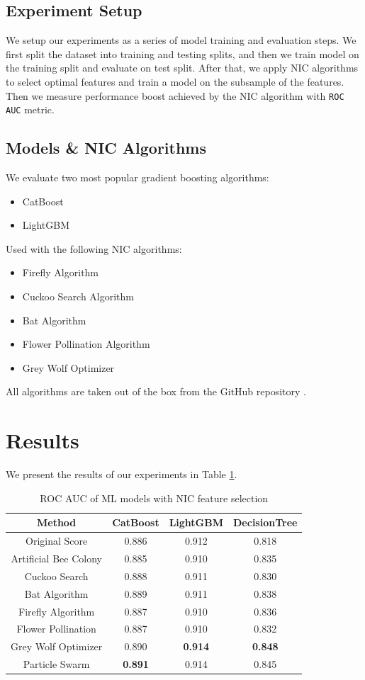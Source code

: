 \documentclass[conference]{IEEEtran}
\begin{document}
\subsection{Experiment Setup}
We setup our experiments as a series of model training and
evaluation steps. We first split the dataset into training and testing
splits, and then we train model on the training split and evaluate on
test split. After that, we apply NIC algorithms to select optimal
features and train a model on the subsample of the features. Then
we measure performance boost achieved by the NIC algorithm with
\texttt{ROC AUC} metric.

\subsection{Models \& NIC Algorithms}
We evaluate two most popular gradient boosting algorithms:
\begin{itemize}
	\item CatBoost \cite{catboost}
	\item LightGBM \cite{lightgbm}
\end{itemize}
Used with the following NIC algorithms:
\begin{itemize}
	\item Firefly Algorithm
	\item Cuckoo Search Algorithm
	\item Bat Algorithm
	\item Flower Pollination Algorithm
	\item Grey Wolf Optimizer
\end{itemize}
All algorithms are taken out of the box from the GitHub repository
\cite{niapy}.

\section{Results}
We present the results of our experiments in Table \ref{tab:results}.

\begin{table}[H]
	\centering
	\caption{ROC AUC of ML models with NIC feature selection}
	\label{tab:results}
	\begin{tabular}{c c c c}
		\hline
		Method & CatBoost & LightGBM & DecisionTree \\
		\hline
		Original Score & 0.886 & 0.912 & 0.818 \\
		Artificial Bee Colony & 0.885 & 0.910 & 0.835 \\
		Cuckoo Search & 0.888 & 0.911 & 0.830 \\
		Bat Algorithm & 0.889 & 0.911 & 0.838 \\
		Firefly Algorithm & 0.887 & 0.910 & 0.836 \\
		Flower Pollination & 0.887 & 0.910 & 0.832 \\
		Grey Wolf Optimizer & 0.890 & \textbf{0.914} & \textbf{0.848} \\
		Particle Swarm & \textbf{0.891} & 0.914 & 0.845 \\
		\end{tabular}
\end{table}
\end{document}
